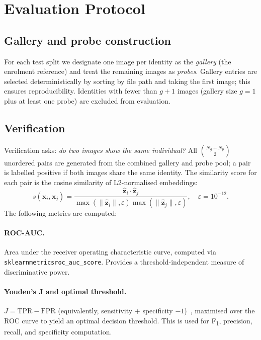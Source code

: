 \section{Evaluation Protocol}
\label{sec:evaluation}

\subsection{Gallery and probe construction}

For each test split we designate one image per identity as the \emph{gallery} (the
enrolment reference) and treat the remaining images as \emph{probes}.  Gallery entries are
selected deterministically by sorting by file path and taking the first image; this ensures
reproducibility.  Identities with fewer than $g + 1$ images (gallery size $g=1$ plus at
least one probe) are excluded from evaluation.

\subsection{Verification}

Verification asks: \emph{do two images show the same individual?}
All $\binom{N_g + N_p}{2}$ unordered pairs are generated from the combined gallery and
probe pool; a pair is labelled positive if both images share the same identity.
The similarity score for each pair is the cosine similarity of L2-normalised embeddings:
\begin{equation}
  s(\mathbf{x}_i, \mathbf{x}_j) = \frac{\hat{\mathbf{z}}_i \cdot \hat{\mathbf{z}}_j}
                                         {\max(\|\hat{\mathbf{z}}_i\|, \varepsilon)
                                          \max(\|\hat{\mathbf{z}}_j\|, \varepsilon)},
  \quad \varepsilon = 10^{-12}.
  \label{eq:cosine}
\end{equation}
The following metrics are computed:

\paragraph{ROC-AUC.}  Area under the receiver operating characteristic curve, computed via
\texttt{sklearnmetricsroc\_auc\_score}.
Provides a threshold-independent measure of discriminative power.

\paragraph{Youden's J and optimal threshold.}  $J = \mathrm{TPR} - \mathrm{FPR}$
(equivalently, sensitivity + specificity $- 1$)~\cite{youden1950}, maximised over the ROC
curve to yield an optimal decision threshold.  This is used for F\textsubscript{1},
precision, recall, and specificity computation.

